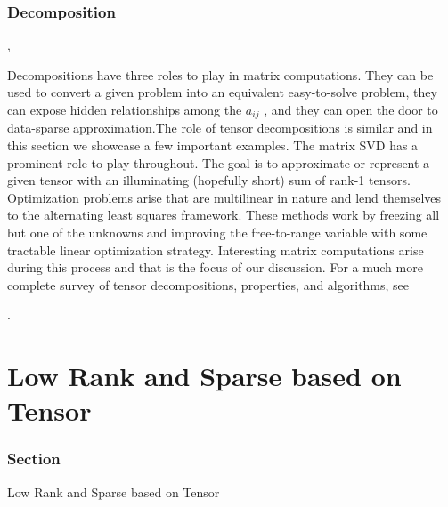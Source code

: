 \documentclass[aspectratio=2516]{beamer}
\begin{document}
\begin{frame}
\frametitle{Decomposition}

{\color{green} \cite{p4}},

\vspace{0.25cm}

\color{blue}

\small 

Decompositions have three roles to play in matrix computations. They can be used to convert a given problem into an equivalent easy-to-solve problem, they can expose
hidden relationships among the $ a_{ij} $ , and they can open the door to data-sparse approximation.The role of tensor decompositions is similar and in this section we showcase
a few important examples. The matrix SVD has a prominent role to play throughout. The goal is to approximate or represent a given tensor with an illuminating (hopefully
short) sum of rank-1 tensors. Optimization problems arise that are multilinear in nature and lend themselves to the alternating least squares framework. These methods
work by freezing all but one of the unknowns and improving the free-to-range variable with some tractable linear optimization strategy. Interesting matrix computations
arise during this process and that is the focus of our discussion. For a much more complete survey of tensor decompositions, properties, and algorithms, see 

\vspace{0.25cm}

{\color{green} \cite{p5}}.

\end{frame}

\section{Low Rank and Sparse based on Tensor}

\begin{frame}
\frametitle{ Section \uppercase\expandafter{}}


\begin{center}
	\Large Low Rank and Sparse based on Tensor
\end{center}

\end{frame}
\end{document}
